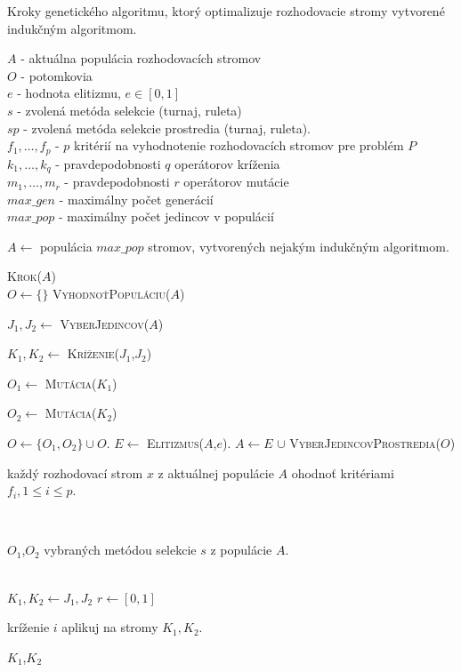 \begin{algorithm}
\caption{Kroky genetického algoritmu, ktorý optimalizuje rozhodovacie stromy vytvorené indukčným algoritmom.}\label{fig:DTGeneticAlgo}
$A$ - aktuálna populácia rozhodovacích stromov \\
$O$ - potomkovia \\
$e$ - hodnota elitizmu, $e \in [0,1]$ \\
$s$ - zvolená metóda selekcie (turnaj, ruleta) \\
$sp$ - zvolená metóda selekcie prostredia (turnaj, ruleta). \\
$f_1,\ldots,f_p$ - $p$ kritérií na vyhodnotenie rozhodovacích stromov pre problém $P$\\
$k_{1},\ldots,k_{q}$ - pravdepodobnosti $q$ operátorov kríženia\\
$m_{1},\ldots,m_{r}$ - pravdepodobnosti $r$ operátorov mutácie\\
$max\_gen$ - maximálny počet generácií \\
$max\_pop$ - maximálny počet jedincov v populácií \\
\bigskip
\begin{algorithmic}[1]
\State \parbox[t]{375pt}{$A \gets $ populácia $max\_pop$ stromov, vytvorených nejakým indukčným algoritmom.}
	\State \textsc{Krok($A$)}
\EndFor
\\
	\State $O \gets \{\}$
	\State \textsc{VyhodnoťPopuláciu($A$)}
		\State \parbox[t]{350pt}{$J_1,J_2 \gets $ \textsc{VyberJedincov($A$)}}
		\State \parbox[t]{350pt}{$K_1,K_2 \gets $ \textsc{Kríženie($J_1$,$J_2$)}}
		\State \parbox[t]{350pt}{$O_1 \gets $ \textsc{Mutácia($K_1$)}}
		\State \parbox[t]{350pt}{$O_2 \gets $ \textsc{Mutácia($K_2$)}}		
		\State $O \gets \{O_1,O_2\} \cup O$.
	\EndWhile
	\State $E \gets$ \textsc{Elitizmus($A$,$e$)}.
	\State $A \gets  E$ $\cup$ \textsc{VyberJedincovProstredia($O$)} 
\EndProcedure
\\
\State \parbox[t]{350pt}{každý rozhodovací strom $x$ z aktuálnej populácie $A$ ohodnoť kritériami $f_i, 1 \leq i \leq p$.}
\EndProcedure
\\
\State \Return \parbox[t]{300pt}{$O_1$,$O_2$ vybraných metódou selekcie $s$ z populácie $A$.}
\EndFunction
\\
\State $K_1, K_2 \gets J_1, J_2$
\State $r \gets [0,1]$
	\State \parbox[t]{300pt}{kríženie $i$ aplikuj na stromy $K_1, K_2$.}
\EndIf
\State \Return $K_1$,$K_2$
\EndFor 
\EndFunction
{}
\end{algorithmic}
\end{algorithm}

